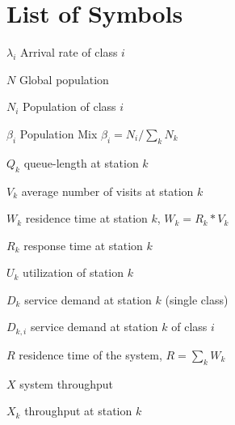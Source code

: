 
%
\chapter{List of Symbols}
\label{cha:symbols}
\begin{description*}
\item[$\lambda_i$] Arrival rate of class $i$
\item[$N$] Global population
\item[$N_i$] Population of class $i$
\item[$\beta_i$] Population Mix $\beta_i = N_i / \sum_k
N_k$
\item[$Q_k$] queue-length at station $k$
\item[$V_k$] average number of visits at station $k$
\item[$W_k$] residence time at station $k$, $W_k = R_k * V_k$
\item[$R_k$] response time at station $k$
\item[$U_k$] utilization of station $k$
\item[$D_{k}$] service demand at station $k$ (single class)
\item[$D_{k,i}$] service demand at station $k$ of class $i$
\item[$R$] residence time of the system, $R= \sum_k W_k$
\item[$X$] system throughput
\item[$X_k$] throughput at station $k$
\end{description*}
%

